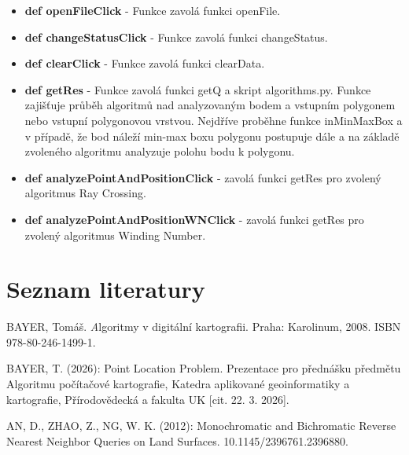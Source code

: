 \documentclass[12pt, a4paper]{article}
\begin{document}
\begin{itemize}
    \item \textbf{def openFileClick} - Funkce zavolá funkci openFile.
    \item \textbf{def changeStatusClick} - Funkce zavolá funkci changeStatus.
    \item \textbf{def clearClick} - Funkce zavolá funkci clearData.
    \item \textbf{def getRes} - Funkce zavolá funkci getQ a skript algorithms.py. Funkce zajišťuje průběh algoritmů nad analyzovaným bodem a vstupním polygonem nebo vstupní polygonovou vrstvou. Nejdříve proběhne funkce inMinMaxBox a v případě, že bod náleží min-max boxu polygonu postupuje dále a na základě zvoleného algoritmu analyzuje polohu bodu k polygonu. 
    \item \textbf{def analyzePointAndPositionClick} - zavolá funkci getRes pro zvolený algoritmus Ray Crossing.
    \item \textbf{def analyzePointAndPositionWNClick} - zavolá funkci getRes pro zvolený algoritmus Winding Number.
\end{itemize}


\newpage
\section*{Seznam literatury}
\vspace{5mm}
BAYER, Tomáš. {\textit Algoritmy v digitální kartografii}. Praha: Karolinum, 2008. ISBN 978-80-246-1499-1.
\vspace{3mm}

\noindent BAYER, T. (2026): Point Location Problem. Prezentace pro přednášku předmětu Algoritmu počítačové kartografie, Katedra aplikované geoinformatiky  a kartografie, Přírodovědecká a fakulta UK [cit. 22. 3. 2026].
\vspace{3mm}

\noindent AN, D., ZHAO, Z., NG, W. K. (2012): Monochromatic and Bichromatic Reverse Nearest Neighbor Queries on Land Surfaces. 10.1145/2396761.2396880.
\end{document}

